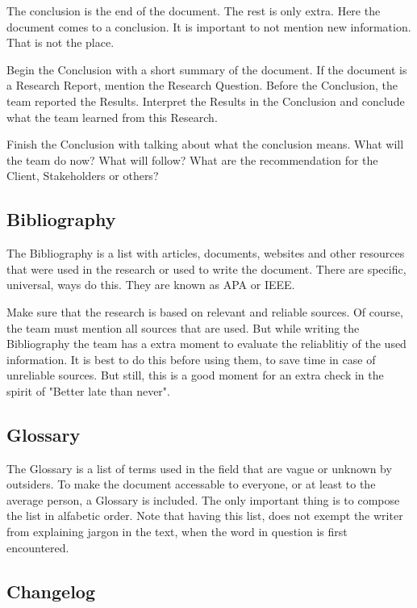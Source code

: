 \documentclass[10pt]{report}
\begin{document}
The conclusion is the end of the document. The rest is only extra. Here the document comes to a conclusion. It is important to not mention new information. That is not the place. 

Begin the Conclusion with a short summary of the document. 
If the document is a Research Report, mention the Research Question. Before the Conclusion, the team reported the Results. Interpret the Results in the Conclusion and conclude what the team learned from this Research.

\bigskip

Finish the Conclusion with talking about what the conclusion means. What will the team do now? What will follow? What are the recommendation for the Client, Stakeholders or others?

\subsection{Bibliography}

The Bibliography is a list with articles, documents, websites and other resources that were used in the research or used to write the document. There are specific, universal, ways do this. They are known as APA or IEEE.

\bigskip

Make sure that the research is based on relevant and reliable sources. Of course, the team must mention all sources that are used. But while writing the Bibliography the team has a extra moment to evaluate the reliablitiy of the used information. It is best to do this before using them, to save time in case of unreliable sources. But still, this is a good moment for an extra check in the spirit of "Better late than never".

\subsection{Glossary}

The Glossary is a list of terms used in the field that are vague or unknown by outsiders. To make the document accessable to everyone, or at least to the average person, a Glossary is included. The only important thing is to compose the list in alfabetic order.
Note that having this list, does not exempt the writer from explaining jargon in the text, when the word in question is first encountered.

\subsection{Changelog}
\end{document}
